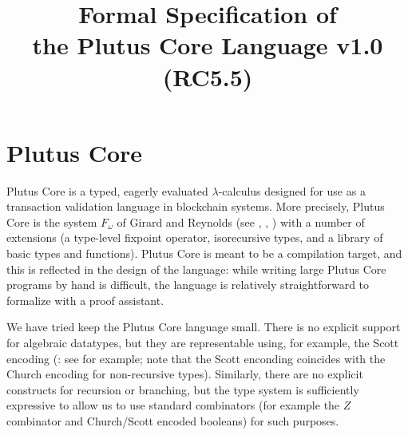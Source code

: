 \documentclass[a4paper]{article}
\begin{document}
%
\title{Formal Specification of\\the Plutus Core Language v1.0 (RC5.5)}


\maketitle

\thispagestyle{plain}
\pagestyle{plain}



\section{Plutus Core}

Plutus Core is a typed, eagerly evaluated $\lambda$-calculus designed
for use as a transaction validation language in blockchain
systems. More precisely, Plutus Core is the system $F_\omega$ of
Girard and Reynolds (see \cite{Girard-thesis},
\cite{Reynolds-type-structure}, \cite[\S30]{Pierce:TAPL}) with a number
of extensions (a type-level fixpoint operator, isorecursive types, and 
a library of basic types and functions).  Plutus Core is
meant to be a compilation target, and this is reflected in the design
of the language: while writing large Plutus Core programs by hand is
difficult, the language is relatively straightforward to formalize
with a proof assistant.

We have tried keep the Plutus Core language small. There is no
explicit support for algebraic datatypes, but they are representable
using, for example, the Scott encoding (\cite{Scott-encoding}: see
\cite{Koopman:2014} for example; note that the Scott enconding
coincides with the Church encoding for non-recursive
types). Similarly, there are no explicit constructs for recursion or
branching, but the type system is sufficiently expressive to allow us
to use standard combinators (for example the $Z$ combinator and
Church/Scott encoded booleans) for such purposes.
\end{document}
